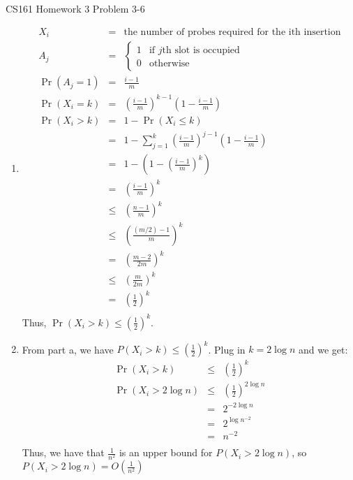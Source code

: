 \documentclass[12pt]{article}
\begin{document}
\begin{center}
{\Large CS161 Homework 3 Problem 3-6}

\end{center}

\begin{enumerate}[label=(\alph*)]
  \item 
  \begin{eqnarray*}
  X_i &=& \text{the number of probes required for the ith insertion}\\
  A_j &=& \left\{\begin{array}{ll}1  & \mbox{if } j\text{th slot is occupied} \\ 0 & \text{otherwise}\end{array}\right.\\
  \Pr(A_j = 1) &=& \frac{i-1}{m}\\
  \Pr(X_i = k) &=& \left( \frac{i-1}{m} \right)^{k-1}\left( 1 - \frac{i-1}{m} \right)\\
  \Pr(X_i > k) &=& 1 - \Pr(X_i \le k)\\
  &=& 1 - \sum_{j = 1}^k \left( \frac{i-1}{m} \right)^{j-1}\left( 1 - \frac{i-1}{m} \right)\\
   &=& 1 - \left(1 -\left( \frac{i-1}{m} \right)^{k}\right)\\
   &=& \left( \frac{i-1}{m} \right)^{k}\\
   &\le& \left( \frac{n-1}{m} \right)^{k}\\
   &\le& \left( \frac{(m/2)-1}{m} \right)^{k}\\
   &=& \left( \frac{m-2}{2m} \right)^{k}\\
   &\le& \left( \frac{m}{2m} \right)^{k}\\
   &=& \left( \frac{1}{2} \right)^{k}\\
  \end{eqnarray*}
  Thus, $\Pr(X_i > k) \le \left( \frac{1}{2} \right)^{k}$.
  \item From part a, we have $P(X_i > k) \le \left( \frac{1}{2} \right)^{k}$. Plug in $k = 2\log n$ and we get:
  \begin{eqnarray*}
  \Pr(X_i > k) &\le& \left( \frac{1}{2} \right)^{k}\\
  \Pr(X_i > 2\log n) &\le& \left( \frac{1}{2} \right)^{2\log n}\\
  &=& 2^{-2\log n}\\
  &=& 2^{\log {n^{-2}}}\\
  &=& n^{-2}\\
  \end{eqnarray*}
  Thus, we have that $\frac{1}{n^2}$ is an upper bound for $P(X_i > 2\log n)$, so $P(X_i > 2\log n) = O\left(\frac{1}{n^2}\right)$

\end{enumerate}
\end{document}
